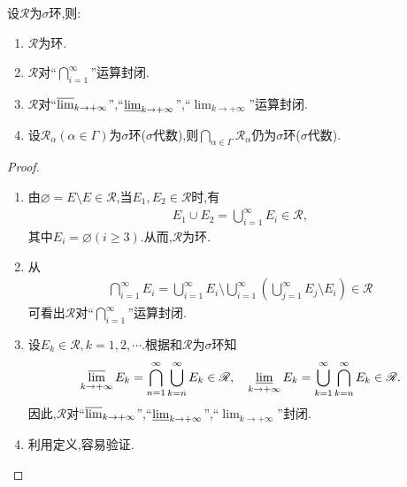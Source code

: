\documentclass[../../main.tex]{subfiles}%
\begin{document}
\begin{theorem}\label{theorem:sigma环或代数的基本性质}
设$\mathscr{R}$为$\sigma$环,则:
\begin{enumerate}[(1)]
\item\label{theorem:sigma环或代数的基本性质-1} $\mathscr{R}$为环.
\item\label{theorem:sigma环或代数的基本性质-2} $\mathscr{R}$对“$\bigcap_{i=1}^{\infty}$”运算封闭.
\item\label{theorem:sigma环或代数的基本性质-3} $\mathscr{R}$对“$\varlimsup_{k \to +\infty}$”,“$\varliminf_{k \to +\infty}$”,“$\lim_{k \to +\infty}$”运算封闭.

\item\label{theorem:sigma环或代数的基本性质-4} 设$\mathscr{R}_\alpha(\alpha \in \Gamma)$为$\sigma$环($\sigma$代数),则$\bigcap_{\alpha \in \Gamma} \mathscr{R}_\alpha$仍为$\sigma$环($\sigma$代数).
\end{enumerate}
\end{theorem}
\begin{proof}
\begin{enumerate}[(1)]
\item 由$\varnothing = E \setminus E \in \mathscr{R}$,当$E_1,E_2 \in \mathscr{R}$时,有
\begin{align*}
E_1 \cup E_2 = \bigcup_{i=1}^{\infty} E_i \in \mathscr{R},
\end{align*}
其中$E_i = \varnothing(i \geqslant 3)$.从而,$\mathscr{R}$为环.

\item 从
\begin{align*}
\bigcap_{i=1}^{\infty} E_i = \bigcup_{i=1}^{\infty} E_i \setminus \bigcup_{i=1}^{\infty} \left( \bigcup_{j=1}^{\infty} E_j \setminus E_i \right) \in \mathscr{R}
\end{align*}
可看出$\mathscr{R}$对“$\bigcap_{i=1}^{\infty}$”运算封闭.

\item 设$E_k \in \mathscr{R},k=1,2,\cdots$.根据和$\mathscr{R}$为$\sigma$环知
\begin{align*}
\varlimsup_{k \to +\infty} E_k = \bigcap_{n=1}^{\infty} \bigcup_{k=n}^{\infty} E_k \in \mathscr{R}, \quad \varliminf_{k \to +\infty} E_k = \bigcup_{k=1}^{\infty} \bigcap_{k=n}^{\infty} E_k \in \mathscr{R}.
\end{align*}
因此,$\mathscr{R}$对“$\varlimsup_{k \to +\infty}$”,“$\varliminf_{k \to +\infty}$”,“$\lim_{k \to +\infty}$”封闭.

\item 利用定义,容易验证.
\end{enumerate}

\end{proof}
\end{document}
